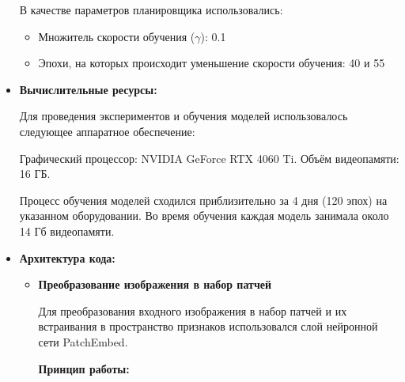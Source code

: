 \begin{itemize}
    В  качестве  параметров  планировщика  использовались: 
    \begin{itemize}
        \item Множитель  скорости  обучения  (\(\gamma\)):  0.1
        \item Эпохи,  на  которых  происходит  уменьшение  скорости  обучения:  40  и  55
    \end{itemize}

    \item \textbf{Вычислительные ресурсы:}

    Для проведения экспериментов и обучения моделей использовалось следующее аппаратное обеспечение:

    Графический процессор: NVIDIA GeForce RTX 4060 Ti. Объём видеопамяти: 16 ГБ.

    Процесс обучения моделей сходился  приблизительно за 4 дня (120 эпох) на указанном оборудовании. Во время обучения каждая модель занимала около 14 Гб видеопамяти. 


    \item  \textbf{Архитектура кода:}

    \begin{itemize}

        \item  \textbf{Преобразование изображения в набор патчей}

        Для преобразования входного изображения в набор патчей и их встраивания в пространство признаков использовался слой нейронной сети PatchEmbed.
        
        \textbf{Принцип работы:}
        

\end{itemize}
\end{itemize}
